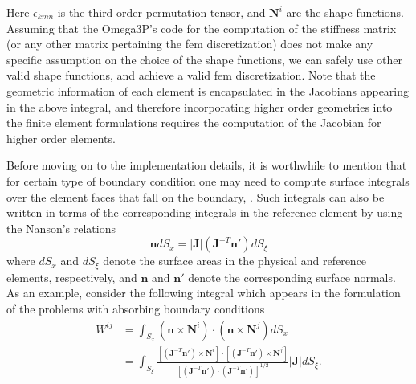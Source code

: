 \documentclass[review,12pt]{elsarticle_summary_report}
\newcommand{\bs}[1]{\boldsymbol{#1}}
\newcommand{\pr}[1]{\left( #1 \right)}
\newcommand{\br}[1]{\left[ #1 \right]}
\newcommand{\abs}[1]{\left | #1 \right |}
\begin{document}
Here $\epsilon_{kmn}$ is the third-order permutation tensor, and $\mathbf{N}^i$ are the shape functions. Assuming that the Omega3P's code for the computation of the stiffness matrix (or any other matrix pertaining the fem discretization) does not make any specific assumption on the choice of the shape functions, we can safely use other valid shape functions, and  achieve a valid fem discretization. Note that the geometric information of each element is encapsulated in the Jacobians appearing in the above integral, and therefore incorporating higher order geometries into the finite element formulations requires the computation of the Jacobian for higher order elements.



Before moving on to the implementation details, it is worthwhile to mention that for certain type of boundary condition one may need to compute surface integrals over the element faces that fall on the boundary, \cite[cf. section II.E. in][, for example]{LeeLi_09}. Such integrals can also be written in terms of the corresponding integrals in the reference element by using the Nanson's relations
\begin{equation}
  \mathbf{n} dS _x = \abs{\bs{J}} \pr{\bs{J}^{-T}\mathbf{n}'} dS _{{\xi}}
  \label{Nanson}
\end{equation}
where $dS_x$ and $dS _{\xi}$ denote the surface areas in the physical and reference elements, respectively, and $\mathbf{n}$ and $\mathbf{n}'$ denote the corresponding surface normals. As an example, consider the following integral which appears in the formulation of the problems with absorbing boundary conditions \cite{LeeLi_09}
\begin{equation}
  \begin{aligned}
    W^{ij} &= \int _{S_x} \pr{\mathbf{n} \times \mathbf{N}^i} \cdot \pr{\mathbf{n} \times \mathbf{N}^j} dS_x \\
    &= \int _{S_\xi} \frac{\br{\pr{\bs{J}^{-T} \mathbf{n}'} \times \mathbf{N}^i} \cdot \br{\pr{\bs{J}^{-T} \mathbf{n}'} \times \mathbf{N}^j}}{\br{\pr{\bs{J}^{-T}\mathbf{n}'} \cdot \pr{\bs{J}^{-T}\mathbf{n}'}}^{1/2}} \abs{\bs{J}}  dS_\xi.
  \end{aligned}
\end{equation}
\end{document}
